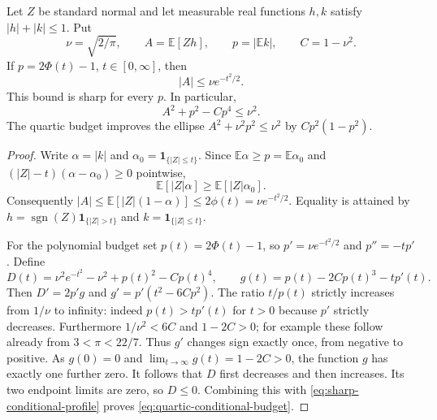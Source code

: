\begin{proposition}
\label{prop:conditional-gaussian-budget}
Let $Z$ be standard normal and let measurable real functions $h,k$ satisfy
$|h|+|k|\leq1$.  Put
\[
 \nu=\sqrt{2/\pi},\qquad A=\mathbb E[Zh],\qquad
 p=|\mathbb E k|,\qquad C=1-\nu^2.
\]
If $p=2\Phi(t)-1$, $t\in[0,\infty]$, then
\begin{equation}\label{eq:sharp-conditional-profile}
 |A|\leq\nu e^{-t^2/2}.
\end{equation}
This bound is sharp for every $p$.  In particular,
\begin{equation}\label{eq:quartic-conditional-budget}
 A^2+p^2-Cp^4\leq\nu^2.
\end{equation}
The quartic budget improves the ellipse
$A^2+\nu^2p^2\leq\nu^2$ by $Cp^2(1-p^2)$.
\end{proposition}

\begin{proof}
Write $\alpha=|k|$ and $\alpha_0=\mathbf1_{\{|Z|\leq t\}}$.
Since $\mathbb E\alpha\geq p=\mathbb E\alpha_0$ and
$(|Z|-t)(\alpha-\alpha_0)\geq0$ pointwise,
\[
 \mathbb E[|Z|\alpha]\geq\mathbb E[|Z|\alpha_0].
\]
Consequently $|A|\leq\mathbb E[|Z|(1-\alpha)]\leq2\phi(t)
=\nu e^{-t^2/2}$.  Equality is attained by
$h=\operatorname{sgn}(Z)\mathbf1_{\{|Z|>t\}}$ and
$k=\mathbf1_{\{|Z|\leq t\}}$.

For the polynomial budget set $p(t)=2\Phi(t)-1$, so
$p'=\nu e^{-t^2/2}$ and $p''=-tp'$.  Define
\[
 D(t)=\nu^2e^{-t^2}-\nu^2+p(t)^2-Cp(t)^4,
 \qquad g(t)=p(t)-2Cp(t)^3-tp'(t).
\]
Then $D'=2p'g$ and $g'=p'(t^2-6Cp^2)$.
The ratio $t/p(t)$ strictly increases from $1/\nu$ to infinity:
indeed $p(t)>tp'(t)$ for $t>0$ because $p'$ strictly decreases.
Furthermore $1/\nu^2<6C$ and $1-2C>0$; for example these follow
already from $3<\pi<22/7$.
Thus $g'$ changes sign exactly once, from negative to positive.
As $g(0)=0$ and $\lim_{t\to\infty}g(t)=1-2C>0$, the function $g$
has exactly one further zero.  It follows that $D$ first decreases
and then increases.  Its two endpoint limits are zero, so $D\leq0$.
Combining this with \eqref{eq:sharp-conditional-profile} proves
\eqref{eq:quartic-conditional-budget}.
\end{proof}

